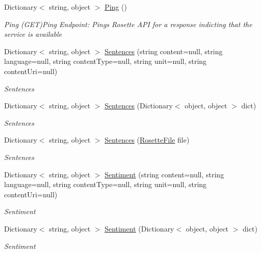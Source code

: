 \begin{DoxyCompactItemize}
Dictionary$<$ string, object $>$ \hyperlink{classrosette__api_1_1_c_a_p_i_ac2cd22efe9ad2fd8eaaf990e278ed6f2}{Ping} ()
\begin{DoxyCompactList}\small\item\em Ping (G\+E\+T)Ping Endpoint\+: Pings Rosette A\+P\+I for a response indicting that the service is available \end{DoxyCompactList}\item 
Dictionary$<$ string, object $>$ \hyperlink{classrosette__api_1_1_c_a_p_i_ae2693ce28755a76c93537e68914b5cb2}{Sentences} (string content=null, string language=null, string content\+Type=null, string unit=null, string content\+Uri=null)
\begin{DoxyCompactList}\small\item\em Sentences \end{DoxyCompactList}\item 
Dictionary$<$ string, object $>$ \hyperlink{classrosette__api_1_1_c_a_p_i_acd9b4b1b5deaf2d5d85464fb4ac7b135}{Sentences} (Dictionary$<$ object, object $>$ dict)
\begin{DoxyCompactList}\small\item\em Sentences \end{DoxyCompactList}\item 
Dictionary$<$ string, object $>$ \hyperlink{classrosette__api_1_1_c_a_p_i_ac8c2831cfaa5fcd727f4eadcbaea567d}{Sentences} (\hyperlink{classrosette__api_1_1_rosette_file}{Rosette\+File} file)
\begin{DoxyCompactList}\small\item\em Sentences \end{DoxyCompactList}\item 
Dictionary$<$ string, object $>$ \hyperlink{classrosette__api_1_1_c_a_p_i_aad62971ec700b73052693fdaa2133939}{Sentiment} (string content=null, string language=null, string content\+Type=null, string unit=null, string content\+Uri=null)
\begin{DoxyCompactList}\small\item\em Sentiment \end{DoxyCompactList}\item 
Dictionary$<$ string, object $>$ \hyperlink{classrosette__api_1_1_c_a_p_i_a22f6c14f1e484355a32af2de6cc9ae57}{Sentiment} (Dictionary$<$ object, object $>$ dict)
\begin{DoxyCompactList}\small\item\em Sentiment \end{DoxyCompactList}\item 

\end{DoxyCompactItemize}
